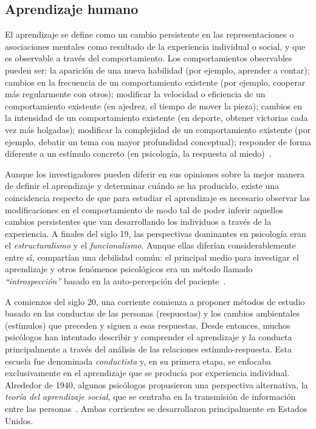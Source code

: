 \documentclass[a4paper,11pt]{book}
\theoremstyle{definition}
\begin{document}

\subsection{Aprendizaje humano}

El aprendizaje se define como un cambio persistente en las representaciones o asociaciones mentales como resultado de la experiencia individual o social, y que es observable a trav\'es del comportamiento.
%
Los comportamientos observables pueden ser: la aparici\'on de una nueva habilidad (por ejemplo, aprender a contar); cambios en la frecuencia de un comportamiento existente (por ejemplo, cooperar m\'as regularmente con otros); modificar la velocidad o eficiencia de un comportamiento existente (en ajedrez, el tiempo de mover la pieza); cambios en la intensidad de un comportamiento existente (en deporte, obtener victorias cada vez m\'as holgadas); modificar la complejidad de un comportamiento existente (por ejemplo, debatir un tema con mayor profundidad conceptual); responder de forma diferente a un est\'imulo concreto (en psicolog\'ia, la respuesta al miedo)~\cite{Ormrod2017}.


Aunque los investigadores pueden diferir en sus opiniones sobre la mejor manera de definir el aprendizaje y determinar cu\'ando se ha producido, existe una coincidencia respecto de que para estudiar el aprendizaje es necesario observar las modificaciones en el comportamiento de modo tal de poder inferir aquellos cambios persistentes que van desarrollando los individuos a trav\'es de la experiencia.
%
A finales del siglo 19, las perspectivas dominantes en psicolog\'ia eran el \emph{estructuralismo} y el \emph{funcionalismo}.
%
Aunque ellas difer\'ian considerablemente entre s\'i, compart\'ian una debilidad com\'un: el principal medio para investigar el aprendizaje y otros fen\'omenos psicol\'ogicos era un m\'etodo llamado \emph{``introspecci\'on''} basado en la auto-percepci\'on del paciente~\cite{Ormrod2017}.


A comienzos del siglo 20, una corriente comienza a proponer m\'etodos de estudio basado en las conductas de las personas (respuestas) y los cambios ambientales (est\'imulos) que preceden y siguen a esas respuestas.
%
Desde entonces, muchos psic\'ologos han intentado describir y comprender el aprendizaje y la conducta principalmente a trav\'es del an\'alisis de las relaciones est\'imulo-respuesta.
%
Esta escuela fue denominada \emph{conductista} y, en su primera etapa, se enfocaba exclusivamente en el aprendizaje que se produc\'ia por experiencia individual.
%
Alrededor de 1940, algunos psic\'ologos propusieron una perspectiva alternativa, la \emph{teor\'ia del aprendizaje social}, que se centraba en la transmisi\'on de informaci\'on entre las personas~\cite{Ormrod2017}.
%
Ambas corrientes se desarrollaron principalmente en Estados Unidos.
\end{document}
